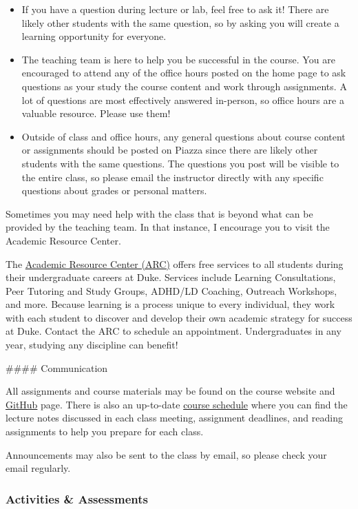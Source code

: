 \documentclass[]{article}
\providecommand{\tightlist}{%
  \setlength{\itemsep}{0pt}\setlength{\parskip}{0pt}}
\begin{document}
\begin{itemize}
\tightlist
\item
  If you have a question during lecture or lab, feel free to ask it!
  There are likely other students with the same question, so by asking
  you will create a learning opportunity for everyone.
\item
  The teaching team is here to help you be successful in the course. You
  are encouraged to attend any of the office hours posted on the home
  page to ask questions as your study the course content and work
  through assignments. A lot of questions are most effectively answered
  in-person, so office hours are a valuable resource. Please use them!
\item
  Outside of class and office hours, any general questions about course
  content or assignments should be posted on Piazza since there are
  likely other students with the same questions. The questions you post
  will be visible to the entire class, so please email the instructor
  directly with any specific questions about grades or personal matters.
\end{itemize}

Sometimes you may need help with the class that is beyond what can be
provided by the teaching team. In that instance, I encourage you to
visit the Academic Resource Center.

The \href{https://arc.duke.edu}{Academic Resource Center (ARC)} offers
free services to all students during their undergraduate careers at
Duke. Services include Learning Consultations, Peer Tutoring and Study
Groups, ADHD/LD Coaching, Outreach Workshops, and more. Because learning
is a process unique to every individual, they work with each student to
discover and develop their own academic strategy for success at Duke.
Contact the ARC to schedule an appointment. Undergraduates in any year,
studying any discipline can benefit!

\#\#\#\# Communication

All assignments and course materials may be found on the course website
and \href{https://github.com/sta199-summer2021}{GitHub} page. There is
also an up-to-date \href{./schedule.html}{course schedule} where you can
find the lecture notes discussed in each class meeting, assignment
deadlines, and reading assignments to help you prepare for each class.

Announcements may also be sent to the class by email, so please check
your email regularly.

\hypertarget{activities-assessments}{%
\subsubsection{Activities \& Assessments}\label{activities-assessments}}
\end{document}

